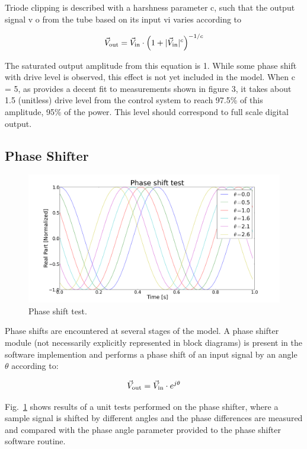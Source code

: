 \documentclass[a4paper,12pt]{article}
\begin{document}
Triode clipping is described with a harshness parameter c, such that the output signal v o from the tube based on its input vi varies according to

\begin{equation}
  \vec V_{\rm out} = \vec V_{\rm in} \cdot \left(1 + |\vec V_{\rm in}|^c\right)^{-1/c}
\end{equation}

The saturated output amplitude from this equation is 1. While some phase shift with drive level is observed, this effect is not yet included in the model. When c = 5, as provides a decent fit to measurements shown in figure 3, it takes about 1.5 (unitless) drive level from the control system to reach 97.5\% of this amplitude, 95\% of the power. This level should correspond to full scale digital output.

\subsection{Phase Shifter}

\begin{figure}
\centering
\includegraphics[scale=0.315]{../figures/phase_shift_test.png}
\caption{Phase shift test.}
\label{fig:phase_shfiter_test}
\end{figure}

Phase shifts are encountered at several stages of the model. A phase shifter module (not necessarily explicitly represented in block diagrams) is present in the software implemention and performs a phase shift of an input signal by an angle $\theta$ according to:

\begin{equation}
  \vec V_{\rm out} = \vec V_{\rm in} \cdot e^{j\theta}
\end{equation}

Fig.~\ref{fig:phase_shfiter_test} shows results of a unit tests performed on the phase shifter, where a sample signal is shifted by different angles and the phase differences are measured and compared with the phase angle parameter provided to the phase shifter software routine.
\end{document}
